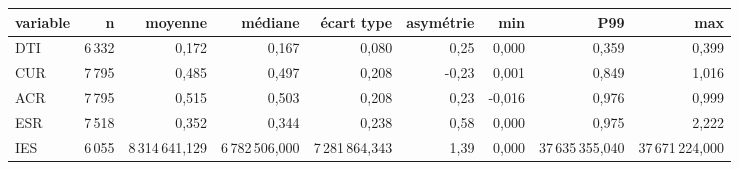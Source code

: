 \begin{tabular}{lrrrrrrrr}
\toprule
\textbf{variable} & \textbf{n} & \textbf{moyenne} & \textbf{médiane} & \textbf{écart type} & \textbf{asymétrie} & \textbf{min} & \textbf{P99} & \textbf{max} \\
\midrule
DTI & 6\,332 & 0,172 & 0,167 & 0,080 & 0,25 & 0,000 & 0,359 & 0,399 \\
CUR & 7\,795 & 0,485 & 0,497 & 0,208 & -0,23 & 0,001 & 0,849 & 1,016 \\
ACR & 7\,795 & 0,515 & 0,503 & 0,208 & 0,23 & -0,016 & 0,976 & 0,999 \\
ESR & 7\,518 & 0,352 & 0,344 & 0,238 & 0,58 & 0,000 & 0,975 & 2,222 \\
IES & 6\,055 & 8\,314\,641,129 & 6\,782\,506,000 & 7\,281\,864,343 & 1,39 & 0,000 & 37\,635\,355,040 & 37\,671\,224,000 \\
\bottomrule
\end{tabular}
